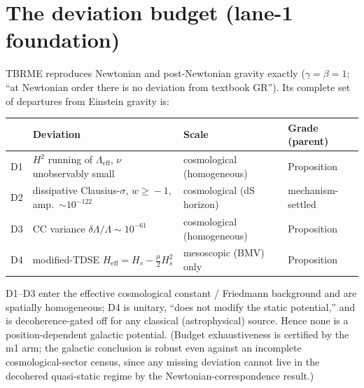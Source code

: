 \documentclass[11pt]{article}
\begin{document}
\section{The deviation budget (lane-1 foundation)}\label{sec:budget}
TBRME reproduces Newtonian and post-Newtonian gravity exactly ($\gamma=\beta=1$;
``at Newtonian order there is no deviation from textbook GR'').
Its complete set of departures from Einstein gravity is:
\begin{center}\small
\begin{tabular}{@{}c l l l@{}}
\toprule
 & Deviation & Scale & Grade (parent) \\
\midrule
D1 & $H^2$ running of $\Lambda_{\mathrm{eff}}$, $\nu$ unobservably small
   & cosmological (homogeneous) & Proposition \\
D2 & dissipative Clausius-$\sigma$, $w\!\ge\!-1$, amp.\ $\sim10^{-122}$
   & cosmological (dS horizon) & mechanism-settled \\
D3 & CC variance $\delta\Lambda/\Lambda\sim10^{-61}$
   & cosmological (homogeneous) & Proposition \\
D4 & modified-TDSE $H_{\mathrm{eff}}=H_s-\tfrac{\mu}{2}H_s^2$
   & mesoscopic (BMV) only & Proposition \\
\bottomrule
\end{tabular}
\end{center}
D1--D3 enter the effective cosmological constant / Friedmann background and are
spatially homogeneous; D4 is unitary, ``does not modify the static potential,''
and is decoherence-gated off for any classical (astrophysical) source. Hence
none is a position-dependent galactic potential. (Budget exhaustiveness is
certified by the m1 arm; the galactic conclusion is robust even against an
incomplete cosmological-sector census, since any missing deviation cannot live
in the decohered quasi-static regime by the Newtonian-correspondence result.)

\end{document}
